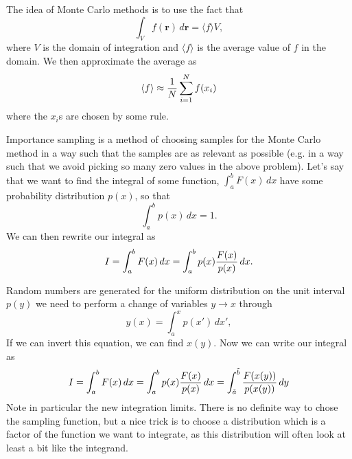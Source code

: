 \documentclass[aps,prc,twocolumn,floatfix]{revtex4}
\def\rvec{\textbf{r}}
\begin{document}
The idea of Monte Carlo methods is to use the fact that
 \begin{equation}
  \int_V f(\rvec)\, d\rvec = \langle f \rangle V,
 \end{equation}
where $V$ is the domain of integration and $\langle f \rangle$ is the average value of $f$ in the domain. We then approximate the average as
\begin{equation}
 \langle f \rangle \approx {1 \over N} \sum_{i=1}^N f(x_i)
\end{equation}
where the $x_i$s are chosen by some rule. 

 Importance sampling is a method of choosing samples for the Monte Carlo method in a way such that the samples are as relevant as possible (e.g. in a way such that we avoid picking so many zero values in the above problem). Let's say that we want to find the integral of some function, $\int_a^b F(x)\, dx$ have some probability distribution $p(x)$, so that 
 \begin{equation}
  \int_a^b p(x) \, dx = 1.
 \end{equation}
We can then rewrite our integral as 
\begin{equation}
 I = \int_a^b F(x)\, dx = \int_a^b p(x) {F(x) \over p(x)}\, dx.
\end{equation}

Random numbers are generated for the uniform distribution on the unit interval $p(y)$ we need to perform a change of variables $y \rightarrow x$ through 
\begin{equation}
 y(x) = \int_a^x p(x')\,dx',
\end{equation}
If we can invert this equation, we can find $x(y)$. Now we can write our integral as
\begin{equation}
 I = \int_a^b F(x)\, dx = \int_a^b p(x) {F(x) \over p(x)}\, dx = \int_{\tilde{a}}^{\tilde{b}} {F(x(y)) \over p(x(y))}\, dy
\end{equation}
Note in particular the new integration limits. There is no definite way to chose the sampling function, but a nice trick is to choose a distribution which is a factor of the function we want to integrate, as this distribution will often look at least a bit like the integrand.
\end{document}
